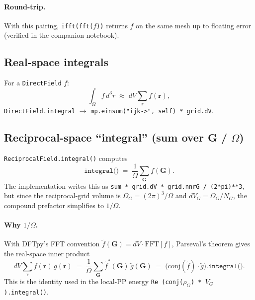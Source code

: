 \documentclass[11pt,a4paper]{article}
\begin{document}
\paragraph{Round-trip.}
With this pairing, \texttt{ifft(fft($f$))} returns $f$ on the same mesh up to floating error
(verified in the companion notebook).

\subsection{Real-space integrals}

For a \texttt{DirectField} $f$:
\begin{equation}
  \int_\Omega f\,d^3r \;\approx\; dV \sum_{\mathbf r} f(\mathbf r),
\end{equation}
\texttt{DirectField.integral} $\to$ \texttt{mp.einsum("ijk->", self) * grid.dV}.

\subsection{Reciprocal-space ``integral'' (sum over G / $\Omega$)}

\texttt{ReciprocalField.integral()} computes
\begin{equation}
  \texttt{integral()} \;=\; \frac{1}{\Omega}\sum_{\mathbf G} f(\mathbf G).
\end{equation}
The implementation writes this as \texttt{sum * grid.dV * grid.nnrG / (2*pi)**3},
but since the reciprocal-grid volume is $\Omega_G=(2\pi)^3/\Omega$ and
$dV_G = \Omega_G/N_G$, the compound prefactor simplifies to $1/\Omega$.

\paragraph{Why $1/\Omega$.}
With DFTpy's FFT convention $\tilde f(\mathbf G)= dV\cdot\mathrm{FFT}[f]$,
Parseval's theorem gives the real-space inner product
\begin{equation}
  dV\sum_{\mathbf r} f(\mathbf r)\,g(\mathbf r)
  \;=\;
  \frac{1}{\Omega}\sum_{\mathbf G}\tilde f^*(\mathbf G)\,\tilde g(\mathbf G)
  \;=\;
  \bigl(\mathrm{conj}(\tilde f)\cdot\tilde g\bigr)\texttt{.integral()}.
\end{equation}
This is the identity used in the local-PP energy
\texttt{Re (conj($\rho_G$) * $V_G$).integral()}.
\end{document}
